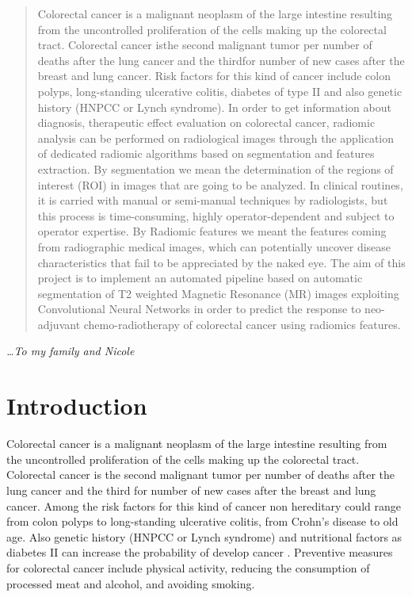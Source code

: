 \documentclass[12pt,a4paper]{report}
\begin{document}
\clearpage

\begin{abstract}
    Colorectal cancer is a malignant neoplasm of the large intestine resulting from the uncontrolled proliferation of the cells making up the colorectal tract.
    Colorectal cancer isthe second malignant tumor per number of deaths after the lung cancer and the thirdfor number of new cases after the breast and lung cancer. Risk factors for this kind of cancer include colon polyps, long-standing ulcerative colitis, diabetes of type II and also genetic history (HNPCC or Lynch syndrome). In order to get information about diagnosis, therapeutic effect evaluation on colorectal cancer, radiomic analysis can be performed on radiological images through the application of dedicated radiomic algorithms based on segmentation and features extraction. By segmentation we mean the determination of the regions of interest (ROI) in images that are going to be analyzed. In clinical routines, it is carried with manual or semi-manual techniques by radiologists, but this process is time-consuming, highly operator-dependent and subject to operator expertise. By Radiomic features we meant the features coming from radiographic medical images, which can potentially uncover disease characteristics that fail to be appreciated by the naked eye.
    The aim of this project is to implement an automated pipeline based on automatic segmentation of T2 weighted Magnetic Resonance (MR) images exploiting Convolutional Neural Networks in order to predict the response to neo-adjuvant chemo-radiotherapy of colorectal cancer using radiomics features.
\end{abstract}

\clearpage
\thispagestyle{empty}
\begin{flushright}
\null{}
\large{\emph{\dots To my family and Nicole}}
\null
\end{flushright}


\clearpage
\tableofcontents


\chapter{Introduction}

Colorectal cancer is a malignant neoplasm of the large intestine resulting from the uncontrolled proliferation of the cells making up the colorectal tract.
Colorectal cancer is the second malignant tumor per number of deaths after the lung cancer and the third for number of new cases after the breast and lung cancer\cite{cancerstats}.
Among the risk factors for this kind of cancer non hereditary could range from colon polyps to long-standing ulcerative colitis, from Crohn's disease to old age. Also genetic history (HNPCC or Lynch syndrome) and nutritional factors as
diabetes II can increase the probability of develop cancer \cite{tesicoppola}.
Preventive measures for colorectal cancer include physical activity, reducing the consumption of processed meat and alcohol, and avoiding smoking\cite{stats2019}.
\end{document}
